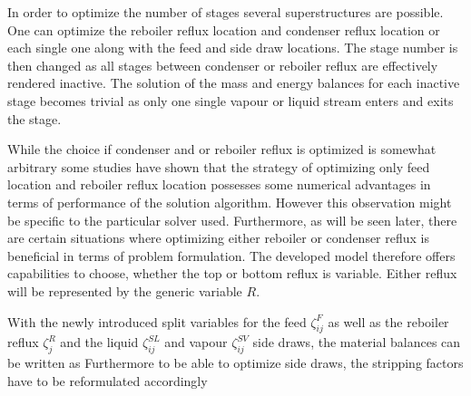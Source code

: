        In order to optimize the number of stages several superstructures are possible. One can
        optimize the reboiler reflux location and condenser reflux location or each single one
        along with the feed and side draw locations. The stage number is then changed as all stages
        between condenser or reboiler reflux are effectively rendered inactive. The solution of
        the mass and energy balances for each inactive stage becomes trivial as only one single
        vapour or liquid stream enters and exits the stage.

        While the choice if condenser and or reboiler
        reflux is optimized is somewhat arbitrary some studies have shown \cite{Grossmann.2005} that
        the strategy of optimizing only feed location and reboiler reflux location possesses some
        numerical advantages in terms of performance of the solution algorithm. However this observation
        might be specific to the particular solver used. Furthermore, as will be seen later, there are
        certain situations where optimizing either reboiler or condenser reflux is beneficial in terms of
        problem formulation. The developed model therefore offers capabilities to choose, whether the top
        or bottom reflux is variable. Either reflux will be represented by the generic variable $R$.

        With the newly introduced split variables for the feed $\zeta^F_{ij}$
        as well as the reboiler reflux $\zeta^R_j$ and the liquid $\zeta^{SL}_{ij}$ and vapour $\zeta^{SV}_{ij}$
        side draws, the material balances can be written as
        Furthermore to be able to optimize side draws, the stripping factors have to be reformulated
        accordingly
